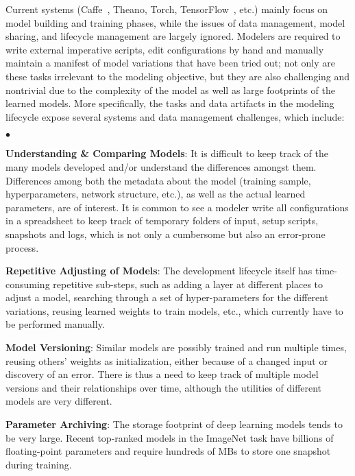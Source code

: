 \documentclass[conference]{IEEEtran}
\begin{document}
Current systems (Caffe~\cite{caffe2014mm}, Theano, Torch, TensorFlow~\cite{tensorflow}, etc.) mainly focus on model building and training phases, while the issues of data management, model sharing, and lifecycle management are largely ignored. Modelers are required to write external imperative scripts, edit configurations by hand and manually maintain a manifest of model variations that have been tried out; not only are these tasks irrelevant to the modeling objective, but they are also challenging and nontrivial due to the complexity of the model as well as large footprints of the learned models. More specifically, the tasks and data artifacts in the modeling lifecycle expose several systems and data management challenges, which include:
\begin{list}{$\bullet$}{\leftmargin 0.10in \topsep -2pt} %
       \item \textbf{Understanding \& Comparing Models}: It is difficult to keep track of the many models developed and/or understand the differences amongst them. Differences among both the metadata about the model (training sample, hyperparameters, network structure, etc.), as well as the actual learned parameters, are of interest. It is common to see a modeler write all configurations in a spreadsheet to keep track of temporary folders of input, setup scripts, snapshots and logs, which is not only a cumbersome but also an error-prone process. 
       \item \textbf{Repetitive Adjusting of Models}: The development lifecycle itself has time-consuming repetitive sub-steps, such as adding a layer at different places to adjust a model, searching through a set of hyper-parameters for the different variations, reusing learned weights to train models, etc., which currently have to be performed manually.
       \item \textbf{Model Versioning}: Similar models are possibly trained and run multiple times, reusing others' weights as initialization, either because of a changed input or discovery of an error. %
       There is thus a need to keep track of multiple model versions and their relationships over time, although the utilities of different models are very different. 
       \item \textbf{Parameter Archiving}: The storage footprint of deep learning models tends to be very large. Recent top-ranked models in the ImageNet task have billions of floating-point parameters and require hundreds of MBs to store one snapshot during training.

\end{list}
\end{document}
